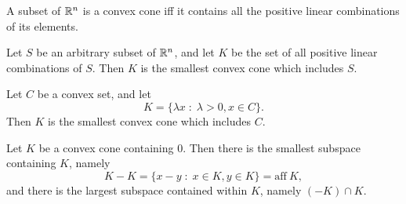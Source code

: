 \documentclass[11pt,a4paper]{article}
\begin{document}
\begin{corollary}\label{cor:convex_cone_conic_combinations}
    A subset of $\mathbb{R}^n$ is a convex cone iff it contains all the positive linear combinations of its elements.
\end{corollary}

\begin{corollary}\label{cor:convex_cone_conic_combinations_2}
    Let $S$ be an arbitrary subset of $\mathbb{R}^n$, and let $K$ be the set of all positive linear combinations of $S$. Then $K$ is the smallest convex cone which includes $S$.
\end{corollary}

\begin{corollary}\label{cor:convex_cone_conic_combinations_3}
    Let $C$ be a convex set, and let 
    \begin{equation*}
        K = \{\lambda x\;:\; \lambda > 0, x\in C\}.
    \end{equation*}
    Then $K$ is the smallest convex cone which includes $C$.
\end{corollary}

\begin{theorem}\label{thm:convex_cones_subspaces}
    Let $K$ be a convex cone containing $0$. Then there is the smallest subspace containing $K$, namely
    \begin{equation*}
        K - K = \{x-y\;:\;x\in K, y\in K\} = \mathrm{aff}\ K,
    \end{equation*}
    and there is the largest subspace contained within $K$, namely $(-K)\cap K$.
\end{theorem}
\end{document}
